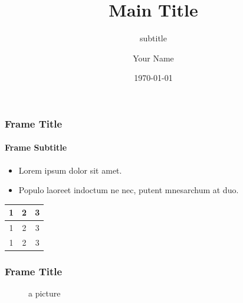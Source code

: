 \documentclass{beamer}
\title[Bottom Bar Title]{Main Title}
\subtitle{subtitle}
\author[YN]{Your Name} %
\institute[UVic]{University of Victoria}
\date{\today}  %
\begin{document}

{
%
\begin{frame}[plain]
	\titlepage
	\vspace{1.75cm} %
\end{frame}
}

\begin{frame}
	\frametitle{Frame Title}
	\framesubtitle{Frame Subtitle}
	\begin{itemize}
		\item Lorem ipsum dolor sit amet.
		\item Populo laoreet indoctum ne nec, putent mnesarchum at duo.
	\end{itemize}
	\begin{table}
		\begin{tabular}{|c|c|c|}\hline
			1&2&3\\ \hline
			1&2&3\\ \hline
			1&2&3\\ \hline
		\end{tabular}
	\end{table}
\end{frame}
\begin{frame}
	\frametitle{Frame Title}
	\begin{figure}[ht]
		\centering
		\begin{pgfpicture}
		\end{pgfpicture}
		\caption{a picture}
	\end{figure}
\end{frame}
\end{document}
